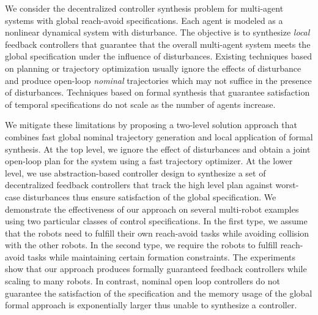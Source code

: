 
We consider the decentralized controller synthesis problem for multi-agent systems with global reach-avoid specifications.
Each agent is modeled as a nonlinear dynamical system with disturbance. The objective is to synthesize \emph{local} feedback controllers that guarantee that the overall multi-agent system meets the global specification under the influence of disturbances.
%
Existing techniques based on planning or trajectory optimization usually ignore the effects of disturbance and produce open-loop
\emph{nominal} trajectories which may not suffice in the presence of disturbances.
Techniques based on formal synthesis that guarantee satisfaction of temporal specifications do not scale as the number of agents increase.

We mitigate these limitations by proposing a two-level solution approach that combines fast global nominal trajectory generation and local application of formal synthesis.
At the top level, we ignore the effect of disturbances and obtain a joint open-loop plan for the system using a fast trajectory optimizer.
At the lower level, we use abstraction-based controller design to synthesize a set of decentralized feedback controllers 
that track the high level plan against worst-case disturbances thus ensure satisfaction of the global specification.
We demonstrate the effectiveness of our approach on several multi-robot examples using two particular classes of control specifications.
In the first type, we assume that the robots need to fulfill their own reach-avoid tasks while avoiding collision with the other robots.
In the second type, we require the robots to fulfill reach-avoid tasks while maintaining certain formation constraints.
The experiments show that our approach produces formally guaranteed feedback controllers while scaling to many robots.
In contrast, nominal open loop controllers do not guarantee the satisfaction of the specification and the memory usage of the global formal approach is exponentially larger thus unable to synthesize a controller.
